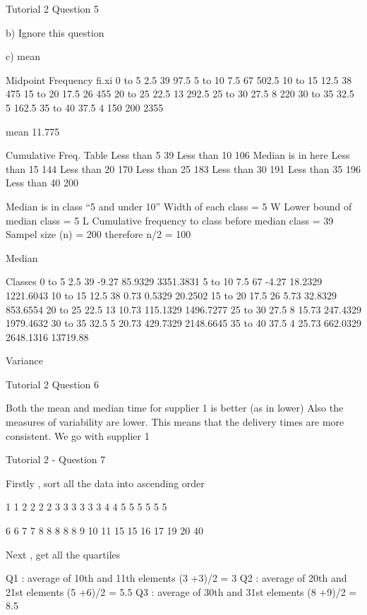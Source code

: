 Tutorial 2 Question 5

b) Ignore this question

c) mean

	Midpoint	Frequency	fi.xi
0 to 5	2.5	39	97.5
5 to 10	7.5	67	502.5
10 to 15	12.5	38	475
15 to 20	17.5	26	455
20 to 25	22.5	13	292.5
25 to 30	27.5	8	220
30 to 35	32.5	5	162.5
35 to 40	37.5	4	150
		200	2355
			
		mean 	11.775


Cumulative  	Freq. 	Table	
Less than 5	39	 
Less than 10	106	Median is in here 
Less than 15	144	 
Less than 20	170	 
Less than 25	183	 
Less than 30	191	 
Less than 35	196	 
Less than 40	200	 

Median is in class “5 and under 10”
Width of each class = 5		W
Lower bound of median class = 5		L
Cumulative frequency to class before median class  = 39
Sampel size (n)  = 200			therefore  n/2 = 100

Median
  


Classes	 	 	 	 	  
0 to 5	2.5	39	-9.27	85.9329	3351.3831
5 to 10	7.5	67	-4.27	18.2329	1221.6043
10 to 15	12.5	38	0.73	0.5329	20.2502
15 to 20	17.5	26	5.73	32.8329	853.6554
20 to 25	22.5	13	10.73	115.1329	1496.7277
25 to 30	27.5	8	15.73	247.4329	1979.4632
30 to 35	32.5	5	20.73	429.7329	2148.6645
35 to 40	37.5	4	25.73	662.0329	2648.1316
					13719.88


 
 
 
 
 
 
Variance	 


Tutorial 2 Question 6

Both the mean and median time for supplier 1 is better (as in lower)
Also the measures of variability are lower. This means that the delivery times are more consistent.
We go with supplier 1








Tutorial 2 - Question 7

Firstly , sort all the data into ascending order

1  	1 	2 	2 	2 	2 	3 	3 	3	 3
3  	3 	4 	4 	5 	5 	5	 5 	5 	5



  	6 	6 	7 	7 	8 	8 	8 	8 	8
9 	10 	11 	15 	15 	16 	17 	19 	20 	40

Next , get all the quartiles

Q1 :  average of 10th and 11th elements		(3 +3)/2 	=	3
Q2 :  average of 20th and 21st elements		(5 +6)/2 	=	5.5
Q3 :  average of 30th and 31st elements		(8 +9)/2 	=	8.5


